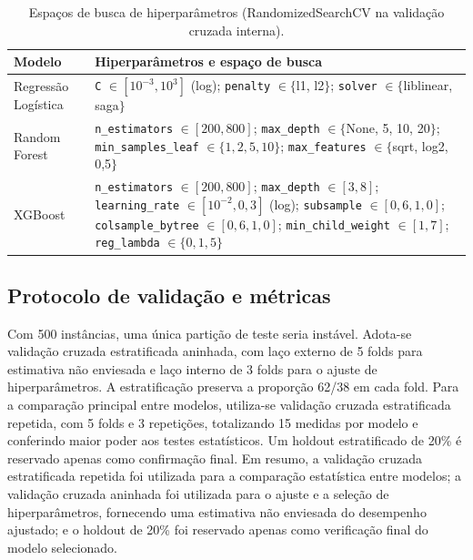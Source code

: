 \documentclass[12pt]{article}
\begin{document}
\begin{table}[ht]
\centering
\caption{Espaços de busca de hiperparâmetros (RandomizedSearchCV na validação cruzada interna).}
\label{tab:hiper}
\footnotesize
\begin{tabular}{p{3.0cm}p{9.2cm}}
\toprule
\textbf{Modelo} & \textbf{Hiperparâmetros e espaço de busca} \\
\midrule
Regressão Logística & \texttt{C} $\in [10^{-3}, 10^{3}]$ (log); \texttt{penalty} $\in \{$l1, l2$\}$; \texttt{solver} $\in \{$liblinear, saga$\}$ \\
Random Forest & \texttt{n\_estimators} $\in [200, 800]$; \texttt{max\_depth} $\in \{$None, 5, 10, 20$\}$; \texttt{min\_samples\_leaf} $\in \{1, 2, 5, 10\}$; \texttt{max\_features} $\in \{$sqrt, log2, 0{,}5$\}$ \\
XGBoost & \texttt{n\_estimators} $\in [200, 800]$; \texttt{max\_depth} $\in [3, 8]$; \texttt{learning\_rate} $\in [10^{-2}, 0{,}3]$ (log); \texttt{subsample} $\in [0{,}6, 1{,}0]$; \texttt{colsample\_bytree} $\in [0{,}6, 1{,}0]$; \texttt{min\_child\_weight} $\in [1, 7]$; \texttt{reg\_lambda} $\in \{0, 1, 5\}$ \\
\bottomrule
\end{tabular}
\end{table}

\subsection{Protocolo de validação e métricas}

Com 500 instâncias, uma única partição de teste seria instável. Adota-se validação cruzada
estratificada aninhada, com laço externo de 5 folds para estimativa não enviesada e laço interno
de 3 folds para o ajuste de hiperparâmetros. A estratificação preserva a proporção 62/38 em cada
fold. Para a comparação principal entre modelos, utiliza-se validação cruzada estratificada
repetida, com 5 folds e 3 repetições, totalizando 15 medidas por modelo e conferindo maior poder
aos testes estatísticos. Um holdout estratificado de 20\% é reservado apenas como confirmação
final. Em resumo, a validação cruzada estratificada repetida foi utilizada para a comparação
estatística entre modelos; a validação cruzada aninhada foi utilizada para o ajuste e a seleção de
hiperparâmetros, fornecendo uma estimativa não enviesada do desempenho ajustado; e o holdout de
20\% foi reservado apenas como verificação final do modelo selecionado.
\end{document}
